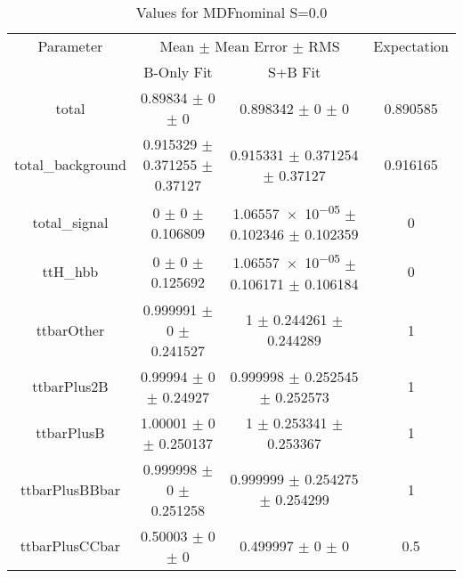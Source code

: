 \begin{table}
\centering
\caption{Values for MDFnominal S=0.0}
\begin{tabular}{cccc}
\toprule
Parameter & \multicolumn{2}{c}{Mean $\pm$ Mean Error $\pm$ RMS} & Expectation\\
 & B-Only Fit & S+B Fit & \\
\midrule
total & \num{0.89834} $\pm$ \num{0} $\pm$ \num{0} & \num{0.898342} $\pm$ \num{0} $\pm$ \num{0} & \num{0.890585}\\
total\_background & \num{0.915329} $\pm$ \num{0.371255} $\pm$ \num{0.37127} & \num{0.915331} $\pm$ \num{0.371254} $\pm$ \num{0.37127} & \num{0.916165}\\
total\_signal & \num{0} $\pm$ \num{0} $\pm$ \num{0.106809} & \num{1.06557e-05} $\pm$ \num{0.102346} $\pm$ \num{0.102359} & \num{0}\\
ttH\_hbb & \num{0} $\pm$ \num{0} $\pm$ \num{0.125692} & \num{1.06557e-05} $\pm$ \num{0.106171} $\pm$ \num{0.106184} & \num{0}\\
ttbarOther & \num{0.999991} $\pm$ \num{0} $\pm$ \num{0.241527} & \num{1} $\pm$ \num{0.244261} $\pm$ \num{0.244289} & \num{1}\\
ttbarPlus2B & \num{0.99994} $\pm$ \num{0} $\pm$ \num{0.24927} & \num{0.999998} $\pm$ \num{0.252545} $\pm$ \num{0.252573} & \num{1}\\
ttbarPlusB & \num{1.00001} $\pm$ \num{0} $\pm$ \num{0.250137} & \num{1} $\pm$ \num{0.253341} $\pm$ \num{0.253367} & \num{1}\\
ttbarPlusBBbar & \num{0.999998} $\pm$ \num{0} $\pm$ \num{0.251258} & \num{0.999999} $\pm$ \num{0.254275} $\pm$ \num{0.254299} & \num{1}\\
ttbarPlusCCbar & \num{0.50003} $\pm$ \num{0} $\pm$ \num{0} & \num{0.499997} $\pm$ \num{0} $\pm$ \num{0} & \num{0.5}\\
\bottomrule
\end{tabular}
\end{table}